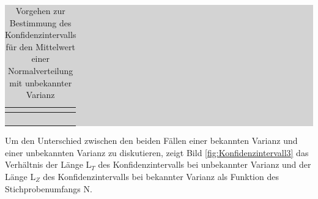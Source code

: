 \begin{table}[H]
\setlength{\arrayrulewidth}{.1em}
\caption{Vorgehen zur Bestimmung des Konfidenzintervalls f\"{u}r den Mittelwert einer Normalverteilung mit unbekannter Varianz}
\setlength{\fboxsep}{0pt}%
\colorbox{lightgray}{%
%
\begin{tabular}{| c | c |}
\hline
\parbox[c][0.3in][c]{0.4in}{\smallskip\centering\textbf{\selectfont{Nr.}}} & 
\parbox[c][0.3in][c]{6.2in}{\smallskip\centering\textbf{\selectfont{Prozessschritt}}}\\ \hline

\parbox[c][0.3in][c]{0.4in}{\centering{}\selectfont{1}} & 
\parbox[c][0.3in][c]{6.2in}{\centering{}\selectfont{Wahl einer Konfidenzzahl $\gamma$}}\\ \hline

\parbox[c][0.9in][c]{0.4in}{\centering{}\selectfont{2}} & 
\parbox[c][0.9in][c]{6.2in}{\centering{}}\\ \hline

\parbox[c][0.9in][c]{0.4in}{\centering{}\selectfont{3}} & 
\parbox[c][0.9in][c]{6.2in}{\centering{}}\\ \hline

\parbox[c][0.9in][c]{0.4in}{\centering{}\selectfont{4}} & 
\parbox[c][0.9in][c]{6.2in}{\centering{}}\\ \hline

\end{tabular}%
}
\label{tab:fivefive}
\end{table}

\noindent Um den Unterschied zwischen den beiden F\"{a}llen einer bekannten Varianz und einer unbekannten Varianz zu diskutieren, zeigt Bild \ref{fig:Konfidenzintervall3} das Verh\"{a}ltnis der L\"{a}nge L$_{T}$ des Konfidenzintervalls bei unbekannter Varianz und der L\"{a}nge L$_{Z}$ des Konfidenzintervalls bei bekannter Varianz als Funktion des Stichprobenumfangs N.

